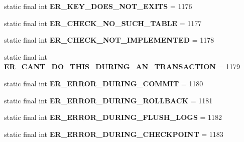 \begin{DoxyCompactItemize}
static final int {\bfseries E\+R\+\_\+\+K\+E\+Y\+\_\+\+D\+O\+E\+S\+\_\+\+N\+O\+T\+\_\+\+E\+X\+I\+TS} = 1176
\item 
\mbox{\label{classcom_1_1mysql_1_1jdbc_1_1_mysql_error_numbers_a7e7f8062ae3459d8cbf8c107d5b4b111}} 
static final int {\bfseries E\+R\+\_\+\+C\+H\+E\+C\+K\+\_\+\+N\+O\+\_\+\+S\+U\+C\+H\+\_\+\+T\+A\+B\+LE} = 1177
\item 
\mbox{\label{classcom_1_1mysql_1_1jdbc_1_1_mysql_error_numbers_a6a621b6f608cac066b22120139ec542b}} 
static final int {\bfseries E\+R\+\_\+\+C\+H\+E\+C\+K\+\_\+\+N\+O\+T\+\_\+\+I\+M\+P\+L\+E\+M\+E\+N\+T\+ED} = 1178
\item 
\mbox{\label{classcom_1_1mysql_1_1jdbc_1_1_mysql_error_numbers_a16f938fdfb3ad1c570c5af53e24ba2d3}} 
static final int {\bfseries E\+R\+\_\+\+C\+A\+N\+T\+\_\+\+D\+O\+\_\+\+T\+H\+I\+S\+\_\+\+D\+U\+R\+I\+N\+G\+\_\+\+A\+N\+\_\+\+T\+R\+A\+N\+S\+A\+C\+T\+I\+ON} = 1179
\item 
\mbox{\label{classcom_1_1mysql_1_1jdbc_1_1_mysql_error_numbers_a3f834ad7476be3a7d26ba9ed13506d27}} 
static final int {\bfseries E\+R\+\_\+\+E\+R\+R\+O\+R\+\_\+\+D\+U\+R\+I\+N\+G\+\_\+\+C\+O\+M\+M\+IT} = 1180
\item 
\mbox{\label{classcom_1_1mysql_1_1jdbc_1_1_mysql_error_numbers_ae2f09eae3af84755fd4e0a69dc5edee8}} 
static final int {\bfseries E\+R\+\_\+\+E\+R\+R\+O\+R\+\_\+\+D\+U\+R\+I\+N\+G\+\_\+\+R\+O\+L\+L\+B\+A\+CK} = 1181
\item 
\mbox{\label{classcom_1_1mysql_1_1jdbc_1_1_mysql_error_numbers_a3f857ed00ec62b0b3bd468797f4c6fe8}} 
static final int {\bfseries E\+R\+\_\+\+E\+R\+R\+O\+R\+\_\+\+D\+U\+R\+I\+N\+G\+\_\+\+F\+L\+U\+S\+H\+\_\+\+L\+O\+GS} = 1182
\item 
\mbox{\label{classcom_1_1mysql_1_1jdbc_1_1_mysql_error_numbers_a6391268103c07d0a848d7c66cb7c249b}} 
static final int {\bfseries E\+R\+\_\+\+E\+R\+R\+O\+R\+\_\+\+D\+U\+R\+I\+N\+G\+\_\+\+C\+H\+E\+C\+K\+P\+O\+I\+NT} = 1183

\end{DoxyCompactItemize}
